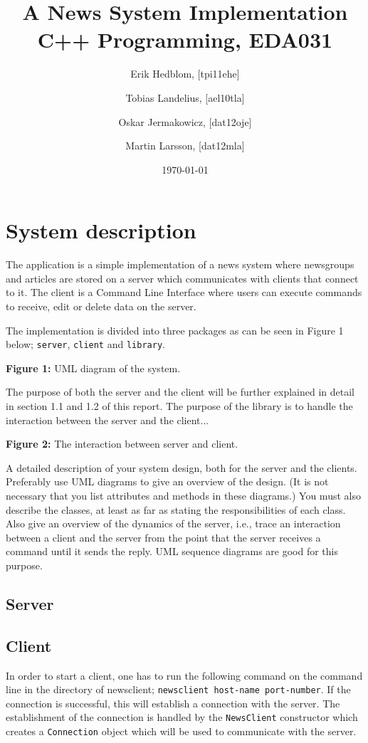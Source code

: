 \documentclass[a4paper]{article}
\title{A News System Implementation \\ C++ Programming, EDA031}
\author{Erik Hedblom, [tpi11ehe]
\and Tobias Landelius, [ael10tla]
\and Oskar Jermakowicz, [dat12oje]
\and Martin Larsson, [dat12mla]}
\date{\today}
\begin{document}
\maketitle

\newpage

\section{System description}
The application is a simple implementation of a news system where newsgroups and articles are stored on a server which communicates with clients that connect to it. The client is a Command Line Interface where users can execute commands to receive, edit or delete data on the server.

The implementation is divided into three packages as can be seen in Figure 1 below; \texttt{server}, \texttt{client} and \texttt{library}.

\begin{center}
\textbf{Figure 1:} UML diagram of the system.
\end{center}

The purpose of both the server and the client will be further explained in detail in section 1.1 and 1.2 of this report. The purpose of the library is to handle the interaction between the server and the client...

\begin{center}
\textbf{Figure 2:} The interaction between server and client.
\end{center}

A detailed description of your system design, both for the server and the clients. Preferably
use UML diagrams to give an overview of the design. (It is not necessary that you list
attributes and methods in these diagrams.) You must also describe the classes, at least as
far as stating the responsibilities of each class.
Also give an overview of the dynamics of the server, i.e., trace an interaction between a
client and the server from the point that the server receives a command until it sends the
reply. UML sequence diagrams are good for this purpose.

\subsection{Server}

\subsection{Client}
In order to start a client, one has to run the following command on the command line in the directory of newsclient; \texttt{newsclient host-name port-number}. If the connection is successful, this will establish a connection with the server. The establishment of the connection is handled by the \texttt{NewsClient} constructor which creates a \texttt{Connection} object which will be used to communicate with the server.
\end{document}
